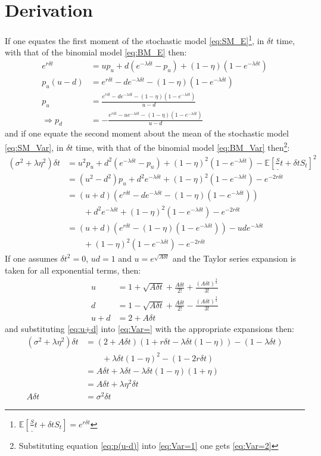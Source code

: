 \documentclass[a4paper,11pt,oneside]{report}
\theoremstyle{plain}
\theoremstyle{definition}
\def\n{\nonumber\\}
\def\E[#1]{\mathbb{E}\left[#1\right]}
\def\S{\ensuremath{S_t}\xspace}
\def\Dt{\ensuremath{\delta t}\xspace}
\def\u{\ensuremath{u}\xspace}
\def\d{\ensuremath{d}\xspace}
\def\pu{\ensuremath{p_\u}\xspace}
\def\pd{\ensuremath{p_\d}\xspace}
\begin{document}
\section{Derivation}
If one equates the first moment of the stochastic model \eqref{eq:SM_E}\footnote{$\E[\frac{S_{t + \Dt}}{\S}] = e^{r\Dt}$}, in \Dt time, with that of the binomial model \eqref{eq:BM_E} then:
\begin{align}
 e^{r\Dt}       &= \u\pu + \d(e^{-\lambda\Dt} - \pu) + (1 - \eta)(1 - e^{-\lambda\Dt}) \n
 \pu(\u - \d)   &= e^{r\Dt} - \d e^{-\lambda\Dt} - (1 - \eta)(1 - e^{-\lambda\Dt}) \label{eq:p(u-d)}\\
 \pu            &= \frac{e^{r\Dt} - \d e^{-\lambda\Dt} - (1 - \eta)(1 - e^{-\lambda\Dt})}{\u - \d} \\
 \Rightarrow\pd &= -\frac{e^{r\Dt} - \u e^{-\lambda\Dt} - (1 - \eta)(1 - e^{-\lambda\Dt})}{\u - \d}
\end{align}
and if one equate the second moment about the mean of the stochastic model \eqref{eq:SM_Var}, in \Dt time, with that of the binomial model \eqref{eq:BM_Var} then\footnote{Substituting equation \eqref{eq:p(u-d)} into \eqref{eq:Var=1} one gets \eqref{eq:Var=2}}:
\begin{align}
 (\sigma^2 + \lambda\eta^2)\Dt &= \u^2\pu + \d^2(e^{-\lambda\Dt} - \pu) + (1 - \eta)^2(1 - e^{-\lambda\Dt}) - \E[\frac{S_{t + \Dt}}{\S}]^2 \n
                        &= (\u^2 - \d^2)\pu + \d^2 e^{-\lambda\Dt} +  (1 - \eta)^2(1 - e^{-\lambda\Dt}) - e^{-2r\Dt} \label{eq:Var=1} \\
                        &= (\u + \d)(e^{r\Dt} - \d e^{-\lambda\Dt} - (1 - \eta)(1 - e^{-\lambda\Dt})) \label{eq:Var=2} \\
                        &\qquad + \d^2 e^{-\lambda\Dt} + (1 - \eta)^2(1 - e^{-\lambda\Dt}) - e^{-2r\Dt} \n
                        &= (\u + \d)(e^{r\Dt} - (1 - \eta)(1 - e^{-\lambda\Dt})) - \u\d e^{-\lambda\Dt} \label{eq:Var=} \\
                        &\qquad + (1 - \eta)^2(1 - e^{-\lambda\Dt}) - e^{-2r\Dt} \nonumber
\end{align}
If one assumes $\Dt^2 = 0$, $\u\d = 1$ and $\u = e^{\sqrt{A\Dt}}$ and the Taylor series expansion is taken for all exponential terms, then:
\begin{align}
 \u                     &= 1 + \sqrt{A\Dt} + \frac{A\Dt}{2!} + \frac{(A\Dt)^{\frac{3}{2}}}{3!} \n
 \d                     &= 1 - \sqrt{A\Dt} + \frac{A\Dt}{2!} - \frac{(A\Dt)^{\frac{3}{2}}}{3!} \n
 \u + \d                &= 2 + A\Dt \label{eq:u+d}
\end{align}
and substituting \eqref{eq:u+d} into \eqref{eq:Var=} with the appropriate expansions then:
\begin{align}
 (\sigma^2 + \lambda\eta^2)\Dt &= (2 + A\Dt)(1 + r\Dt - \lambda\Dt(1 - \eta)) - (1 - \lambda\Dt) \n
                        &\qquad + \lambda\Dt(1 - \eta)^2 - (1 - 2r\Dt) \n
                        &= A\Dt + \lambda\Dt - \lambda\Dt(1 - \eta)(1 + \eta) \n
                        &= A\Dt + \lambda\eta^2\Dt \n
 A\Dt                   &= \sigma^2\Dt
\end{align}
\end{document}
